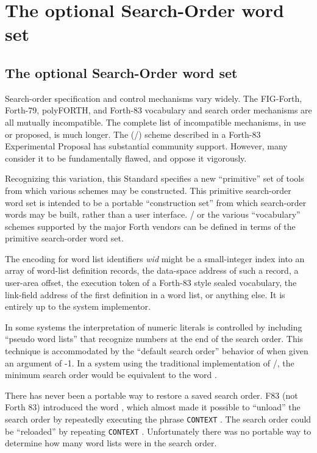 \chapter{The optional Search-Order word set} %

\begin{intro}
\section{The optional Search-Order word set} %

Search-order specification and control mechanisms vary widely. The
FIG-Forth, Forth-79, polyFORTH, and Forth-83 vocabulary and search
order mechanisms are all mutually incompatible. The complete list of
incompatible mechanisms, in use or proposed, is much longer. The
(/) scheme described in a Forth-83 Experimental
Proposal has substantial community support. However, many consider it
to be fundamentally flawed, and oppose it vigorously.

Recognizing this variation, this Standard specifies a new ``primitive''
set of tools from which various schemes may be constructed. This
primitive search-order word set is intended to be a portable
``construction set'' from which search-order words may be built,
rather than a user interface. / or the various
``vocabulary'' schemes supported by the major Forth vendors can be
defined in terms of the primitive search-order word set.

The encoding for word list identifiers \emph{wid} might be a
small-integer index into an array of word-list definition records, the
data-space address of such a record, a user-area offset, the execution
token of a Forth-83 style sealed vocabulary, the link-field address of
the first definition in a word list, or anything else. It is entirely
up to the system implementor.

In some systems the interpretation of numeric literals is controlled
by including ``pseudo word lists'' that recognize numbers at the end
of the search order. This technique is accommodated by the ``default
search order'' behavior of  when given an argument of
-1. In a system using the traditional implementation of
/, the minimum search order would be equivalent
to the word .

There has never been a portable way to restore a saved search order.
F83 (not Forth 83) introduced the word , which almost
made it possible to ``unload'' the search order by repeatedly executing
the phrase \texttt{CONTEXT}  . The search
order could be ``reloaded'' by repeating  \texttt{CONTEXT}
\word[core]{!}. Unfortunately there was no portable way to determine
how many word lists were in the search order.


\end{intro}
